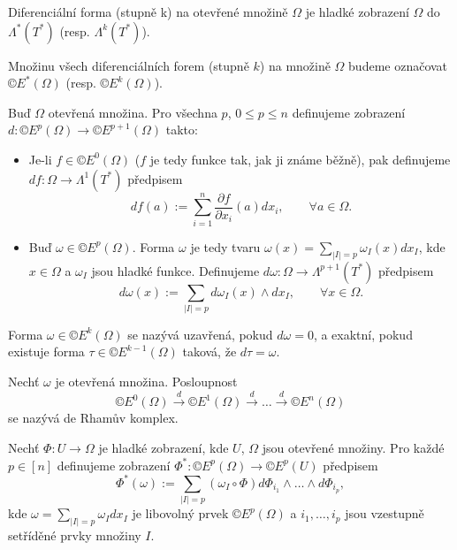 \documentclass[12pt]{article}                   %
\begin{document}
        \begin{definice}[Diferenciální forma, diferenciální forma stupně $k$ (=$k$-forma)]
            Diferenciální forma (stupně k) na otevřené množině $\Omega$ je hladké zobrazení $\Omega$ do $\Lambda^*(T^*)$ (resp. $\Lambda^k(T^*)$).

            Množinu všech diferenciálních forem (stupně $k$) na množině $\Omega$ budeme označovat $©E^*(\Omega)$ (resp. $©E^k(\Omega)$).
        \end{definice}

        \begin{definice}
            Buď $\Omega$ otevřená množina. Pro všechna $p$, $0 ≤ p ≤ n$ definujeme zobrazení $d: ©E^p(\Omega) \rightarrow ©E^{p + 1}(\Omega)$ takto:

            \begin{itemize}
                \item Je-li $f \in ©E^0(\Omega)$ ($f$ je tedy funkce tak, jak ji známe běžně), pak definujeme $df: \Omega \rightarrow \Lambda^1(T^*)$ předpisem
                    $$ df(a) := \sum_{i=1}^n \frac{\partial f}{\partial x_i}(a) dx_i, \qquad \forall a \in \Omega. $$
            \item Buď $\omega \in ©E^p(\Omega)$. Forma $\omega$ je tedy tvaru $\omega(x) = \sum_{|I| = p} \omega_I(x)dx_I$, kde $x \in \Omega$ a $\omega_I$ jsou hladké funkce. Definujeme $d\omega: \Omega \rightarrow \Lambda^{p+1}(T^*)$ předpisem
                $$ d\omega(x) := \sum_{|I| = p} d\omega_I(x) \wedge dx_I, \qquad \forall x \in \Omega. $$ 
            \end{itemize}
        \end{definice}

        \begin{definice}
            Forma $\omega \in ©E^k(\Omega)$ se nazývá uzavřená, pokud $d\omega = 0$, a exaktní, pokud existuje forma $\tau \in ©E^{k-1}(\Omega)$ taková, že $d\tau = \omega$.
        \end{definice}

        \begin{definice}
            Nechť $\omega$ je otevřená množina. Posloupnost
            $$ ©E^0(\Omega) \overset{d}{\rightarrow} ©E^1(\Omega) \overset{d}{\rightarrow} … \overset{d}{\rightarrow} ©E^n(\Omega) $$ 
            se nazývá de Rhamův komplex.
        \end{definice}

        \begin{definice}
            Nechť $\Phi: U \rightarrow \Omega$ je hladké zobrazení, kde $U$, $\Omega$ jsou otevřené množiny. Pro každé $p \in [n]$ definujeme zobrazení $\Phi^*: ©E^p(\Omega) \rightarrow ©E^p(U)$ předpisem
            $$ \Phi^*(\omega) := \sum_{|I| = p} (\omega_I \circ \Phi) d\Phi_{i_1} \wedge … \wedge d\Phi_{i_p}, $$
            kde $\omega = \sum_{|I| = p} \omega_I dx_I$ je libovolný prvek $©E^p(\Omega)$ a $i_1, …, i_p$ jsou vzestupně setříděné prvky množiny $I$.
        \end{definice}
\end{document}
